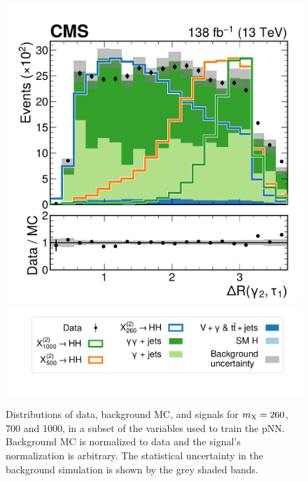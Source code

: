 \begin{figure}
    \includegraphics[width=.49\linewidth]{Figures/Dihiggs/categorisation/input_features/Graviton/Scale_equal/SubleadPhoton_lead_lepton_dR_GluGluToBulkGravitonToHHTo2G2Tau_M-1000_linear.pdf} \\
    \includegraphics[width=.7\linewidth]{Figures/Dihiggs/categorisation/input_features/Graviton/Scale_equal/legend.pdf}
    \caption[Distributions of Training Features (3)]{Distributions of data, background MC, and \XTwoHH signals for $m_{\mathrm{X}}=260$, 700 and 1000\GeV, in a subset of the variables used to train the pNN. Background MC is normalized to data and the signal's normalization is arbitrary. The statistical uncertainty in the background simulation is shown by the grey shaded bands.}\label{fig:training_features_3}
\end{figure}

